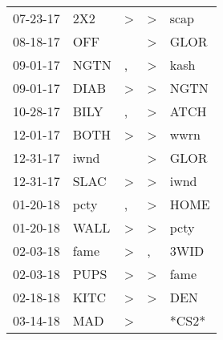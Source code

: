 \begin{supertabular}{p{0.07\textwidth}p{0.06\textwidth}p{0.02\textwidth}p{0.02\textwidth}p{0.06\textwidth}}
          07-23-17\textsuperscript{} &            2X2\textsuperscript{} &     \textgreater &     \textgreater &           scap\textsuperscript{} \\
          08-18-17\textsuperscript{} &            OFF\textsuperscript{} &                  &     \textgreater &           GLOR\textsuperscript{} \\
          09-01-17\textsuperscript{} &           NGTN\textsuperscript{} &                , &     \textgreater &           kash\textsuperscript{} \\
          09-01-17\textsuperscript{} &           DIAB\textsuperscript{} &     \textgreater &     \textgreater &           NGTN\textsuperscript{} \\
          10-28-17\textsuperscript{} &           BILY\textsuperscript{} &                , &     \textgreater &           ATCH\textsuperscript{} \\
          12-01-17\textsuperscript{} &           BOTH\textsuperscript{} &     \textgreater &     \textgreater &           wwrn\textsuperscript{} \\
          12-31-17\textsuperscript{} &           iwnd\textsuperscript{} &                  &     \textgreater &           GLOR\textsuperscript{} \\
          12-31-17\textsuperscript{} &           SLAC\textsuperscript{} &     \textgreater &     \textgreater &           iwnd\textsuperscript{} \\
          01-20-18\textsuperscript{} &           pcty\textsuperscript{} &                , &     \textgreater &           HOME\textsuperscript{} \\
          01-20-18\textsuperscript{} &           WALL\textsuperscript{} &     \textgreater &     \textgreater &           pcty\textsuperscript{} \\
          02-03-18\textsuperscript{} &           fame\textsuperscript{} &     \textgreater &                , &           3WID\textsuperscript{} \\
          02-03-18\textsuperscript{} &           PUPS\textsuperscript{} &     \textgreater &     \textgreater &           fame\textsuperscript{} \\
          02-18-18\textsuperscript{} &           KITC\textsuperscript{} &     \textgreater &     \textgreater &            DEN\textsuperscript{} \\
          03-14-18\textsuperscript{} &            MAD\textsuperscript{} &     \textgreater &                  &                            *CS2* \\

\end{supertabular}
